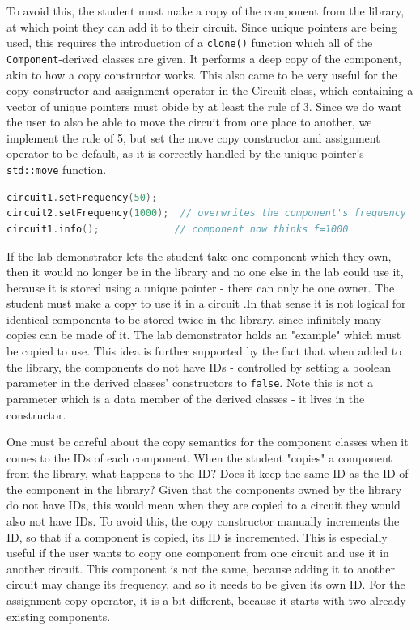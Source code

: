 \documentclass[11pt, letterpaper]{article}
\begin{document}
To avoid this, the student must make a copy of the component from the library, at which point they can add it to their circuit. Since unique pointers are being used, this requires the introduction of a \verb|clone()| function which all of the \verb|Component|-derived classes are given. It performs a deep copy of the component, akin to how a copy constructor works. This also came to be very useful for the copy constructor and assignment operator in the Circuit class, which containing a vector of unique pointers must obide by at least the rule of 3. Since we do want the user to also be able to move the circuit from one place to another, we implement the rule of 5, but set the move copy constructor and assignment operator to be default, as it is correctly handled by the unique pointer's \verb|std::move| function.

\begin{lstlisting}[language=C++, caption=Shared pointers don't work well for library of components, label=list:sharedptr]
circuit1.setFrequency(50);
circuit2.setFrequency(1000);  // overwrites the component's frequency
circuit1.info();             // component now thinks f=1000
\end{lstlisting}

If the lab demonstrator lets the student take one component which they own, then it would no longer be in the library and no one else in the lab could use it, because it is stored using a unique pointer - there can only be one owner. The student must make a copy to use it in a circuit .In that sense it is not logical for identical components to be stored twice in the library, since infinitely many copies can be made of it. The lab demonstrator holds an "example" which must be copied to use. This idea is further supported by the fact that when added to the library, the components do not have IDs - controlled by setting a boolean parameter in the derived classes' constructors to \verb|false|. Note this is not a parameter which is a data member of the derived classes - it lives in the constructor. 

One must be careful about the copy semantics for the component classes when it comes to the IDs of each component. When the student "copies" a component from the library, what happens to the ID? Does it keep the same ID as the ID of the component in the library? Given that the components owned by the library do not have IDs, this would mean when they are copied to a circuit they would also not have IDs. To avoid this, the copy constructor manually increments the ID, so that if a component is copied, its ID is incremented. This is especially useful if the user wants to copy one component from one circuit and use it in another circuit. This component is not the same, because adding it to another circuit may change its frequency, and so it needs to be given its own ID. For the assignment copy operator, it is a bit different, because it starts with two already-existing components. 
\end{document}
